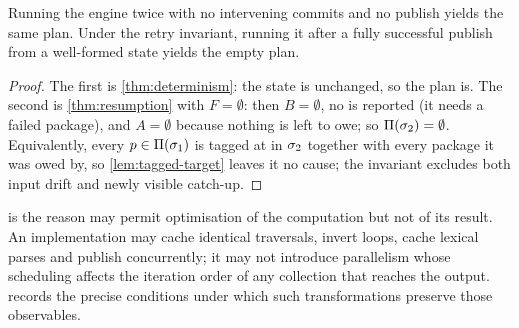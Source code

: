 \begin{corollary}[idempotency]
\label{cor:idempotency}
Running the engine twice with no intervening commits and no publish yields the
same plan. Under the retry invariant, running it after a fully successful
publish from a well-formed state yields the empty plan.
\end{corollary}

\begin{proof}
The first is \cref{thm:determinism}: the state is unchanged, so the plan is.
The second is \cref{thm:resumption} with $F = \emptyset$: then $B = \emptyset$,
no  is reported (it needs a failed package), and $A = \emptyset$
because nothing is left to owe; so $\Pi(\sigma_2) = \emptyset$. Equivalently,
every $p \in \Pi(\sigma_1)$ is tagged at \Head{} in $\sigma_2$ together with every
package it was owed by, so \cref{lem:tagged-target} leaves it no cause; the
invariant excludes both input drift and newly visible catch-up.
\end{proof}

\begin{remark}
 is the reason  may permit
optimisation of the computation but not of its result. An implementation may
cache identical traversals, invert loops, cache lexical parses and publish concurrently; it may
not introduce parallelism whose scheduling affects the iteration order of any
collection that reaches the output.  records the precise
conditions under which such transformations preserve those observables.
\end{remark}
